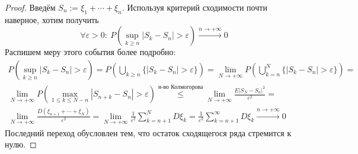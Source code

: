 \documentclass[a4paper,12pt]{article}
\renewcommand{\leq}{\ensuremath{\leqslant}}
\renewcommand{\geq}{\ensuremath{\geqslant}}
\theoremstyle{plain}
\theoremstyle{definition}
\theoremstyle{remark}
\begin{document}
\begin{proof}
	Введём $S_n := \xi_1 + \cdots + \xi_n$. Используя критерий сходимости почти наверное, хотим получить
	\[\forall \varepsilon > 0:\: P\left(\sup_{k \geq n} |S_k - S_n| > \varepsilon\right) \stackrel{n \to +\infty}{\to} 0\]
	Распишем меру этого события более подробно:
	\begin{align*}
		P\left(\sup_{k \geq n} |S_k - S_n| > \varepsilon\right) = P\left(\bigcup_{k \geq n}\{|S_k - S_n| > \varepsilon\}\right) = \lim_{N \to +\infty} P\left(\bigcup_{k = n}^N \{|S_k - S_n| > \varepsilon\}\right) = \\
		\lim_{N \to +\infty} P\left(\max_{1 \leq k \leq N - n} |S_{n + k} - S_n| > \varepsilon\right) \stackrel{\text{н-во Колмогорова}}{\leq} \lim_{N \to +\infty} \frac{E|S_N - S_n|^2}{\varepsilon^2} =\\
		\lim_{N \to +\infty} \frac{D(\xi_{n + 1} + \cdots + \xi_N)}{\varepsilon^2} = \lim_{N \to +\infty} \frac{1}{\varepsilon^2}\sum_{k = n + 1}^N D\xi_k = \frac{1}{\varepsilon^2} \sum_{k = n + 1}^\infty D\xi_k \stackrel{n \to +\infty}{\to} 0
	\end{align*}
	Последний переход обусловлен тем, что остаток сходящегося ряда стремится к нулю.
\end{proof}
\end{document}
